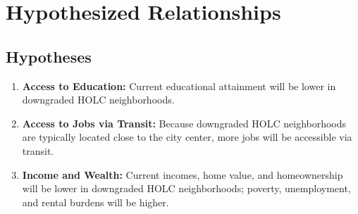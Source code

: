 \documentclass[paper=letter, fontsize=12pt]{scrartcl} %
\begin{document}
\section{Hypothesized Relationships}
\subsection{Hypotheses}
\begin{enumerate}
	\item \textbf{Access to Education:} Current educational attainment will be lower in downgraded HOLC neighborhoods.
	\item \textbf{Access to Jobs via Transit:} Because downgraded HOLC neighborhoods are typically located close to the city center, more jobs will be accessible via transit.
	\item \textbf{Income and Wealth:} Current incomes, home value, and homeownership will be lower in downgraded HOLC neighborhoods; poverty, unemployment, and rental burdens will be higher.
\end{enumerate}
\end{document}
